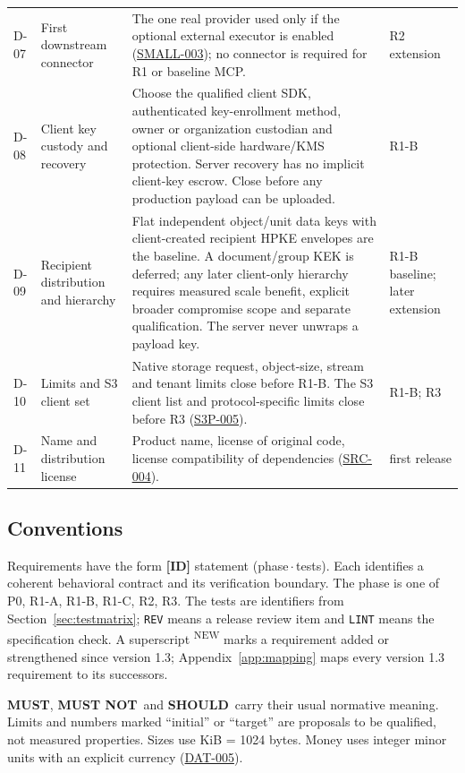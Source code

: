 \documentclass[11pt,a4paper]{article}
\newcommand{\must}{\textbf{MUST}}
\newcommand{\mustnot}{\textbf{MUST NOT}}
\newcommand{\should}{\textbf{SHOULD}}
\newcommand{\code}[1]{{\small\nolinkurl{#1}}}
\newcommand{\rr}[1]{\hyperlink{req:#1}{#1}}
\newcommand{\reqtag}[2]{{\footnotesize\color{accent}(#1\,$\cdot$\,#2)}}
\begin{document}
\begin{longtable}{@{}P{0.06\textwidth}P{0.22\textwidth}P{0.46\textwidth}P{0.12\textwidth}@{}}
D-07 & First downstream connector & The one real provider used only if the optional external executor is enabled (\rr{SMALL-003}); no connector is required for R1 or baseline MCP. & R2 extension\\
D-08 & Client key custody and recovery & Choose the qualified client SDK, authenticated key-enrollment method, owner or organization custodian and optional client-side hardware/KMS protection. Server recovery has no implicit client-key escrow. Close before any production payload can be uploaded. & R1-B\\
D-09 & Recipient distribution and hierarchy & Flat independent object/unit data keys with client-created recipient HPKE envelopes are the baseline. A document/group KEK is deferred; any later client-only hierarchy requires measured scale benefit, explicit broader compromise scope and separate qualification. The server never unwraps a payload key. & R1-B baseline; later extension\\
D-10 & Limits and S3 client set & Native storage request, object-size, stream and tenant limits close before R1-B. The S3 client list and protocol-specific limits close before R3 (\rr{S3P-005}). & R1-B; R3\\
D-11 & Name and distribution license & Product name, license of original code, license compatibility of dependencies (\rr{SRC-004}). & first release\\
\bottomrule
\end{longtable}

\subsection{Conventions}
Requirements have the form \textbf{[ID]} statement \reqtag{phase}{tests}. Each identifies a coherent behavioral contract and its verification boundary. The phase is one of P0, R1-A, R1-B, R1-C, R2, R3. The tests are identifiers from Section~\ref{sec:testmatrix}; \code{REV} means a release review item and \code{LINT} means the specification check. A superscript \textsuperscript{\color{accent}\tiny NEW} marks a requirement added or strengthened since version 1.3; Appendix~\ref{app:mapping} maps every version 1.3 requirement to its successors.

\must, \mustnot\ and \should\ carry their usual normative meaning. Limits and numbers marked ``initial'' or ``target'' are proposals to be qualified, not measured properties. Sizes use KiB = 1024 bytes. Money uses integer minor units with an explicit currency (\rr{DAT-005}).
\end{document}
